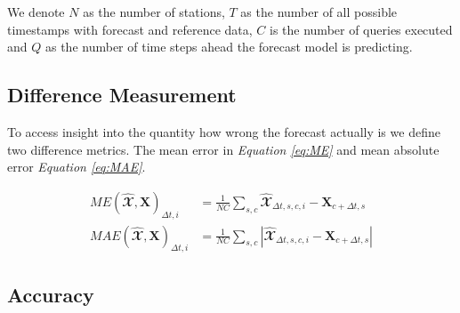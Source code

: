 \documentclass{article}
\theoremstyle{plain}
\theoremstyle{definition}
\theoremstyle{remark}
\begin{document}
We denote $N$ as the number of stations, $T$ as the number of all possible
timestamps with forecast and reference data, $C$ is the number of queries
executed and $Q$ as the number of time steps ahead the forecast model is
predicting.

\subsection{Difference Measurement}\label{sec:mean}
To access insight into the quantity how wrong the forecast actually is we
define two difference metrics. The mean error in \textit{Equation \ref{eq:ME}}
and mean absolute error \textit{Equation \ref{eq:MAE}}.

\begin{align}
    ME(\hat{\mathbfcal{X}}, \textbf{X})_{\Delta t, i}  & =   \frac{1}{N C}
    \sum_{s, c} \hat{\mathbfcal{X}}_{\Delta t, s, c, i} - \textbf{X}_{c + \Delta t,
        s}
    \label{eq:ME}                                                          \\
    MAE(\hat{\mathbfcal{X}}, \textbf{X})_{\Delta t, i} & =   \frac{1}{N C}
    \sum_{s, c} |\hat{\mathbfcal{X}}_{\Delta t, s, c, i} - \textbf{X}_{c + \Delta
        t, s}|
    \label{eq:MAE}
\end{align}




\subsection{Accuracy}\label{sec:accuracy}
\end{document}
